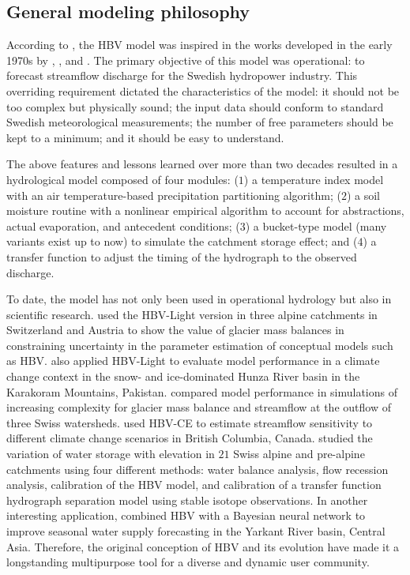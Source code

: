 \subsection{General modeling philosophy}

According to \citet{bergstrom:2015}, the HBV model was inspired in the works developed in the early 1970s by
\citet{nash:1970}, \citet{oconnell:1970}, and \citet{mandeville:1970}. The primary objective of this model was operational: to
forecast streamflow discharge for the Swedish hydropower industry. This overriding requirement dictated the characteristics of the
model: it should not be too complex but physically sound; the input data should conform to standard Swedish meteorological
measurements; the number of free parameters should be kept to a minimum; and it should be easy to understand.

The above features and lessons learned over more than two decades \citep{bergstrom:1991} resulted in a hydrological model
composed of four modules: ($1$) a temperature index model with an air temperature-based precipitation partitioning algorithm;
($2$) a soil moisture routine with a nonlinear empirical algorithm to account for abstractions, actual evaporation, and antecedent
conditions; ($3$) a bucket-type model (many variants exist up to now) to simulate the catchment storage effect; and ($4$) a transfer function to adjust the timing of the hydrograph to
the observed discharge.

To date, the model has not only been used in operational hydrology but also in scientific research.
\citet{konz:2010} used the HBV-Light version in three alpine catchments in Switzerland and Austria to show the value of glacier
mass balances in constraining uncertainty in the parameter estimation of conceptual models such as HBV. \citet{ali:2018} also applied
HBV-Light to evaluate model performance in a climate change context in the snow- and ice-dominated Hunza River basin in the
Karakoram Mountains, Pakistan. \citet{finger:2015} compared model performance in simulations of increasing complexity for glacier
mass balance and streamflow at the outflow of three Swiss watersheds. \citet{stahl_hbv:2008} used HBV-CE to estimate streamflow
sensitivity to different climate change scenarios in British Columbia, Canada. \citet{staudinger:2017} studied the variation of 
water storage with elevation in $21$ Swiss alpine and pre-alpine catchments using four different methods: water balance analysis, 
flow recession analysis, calibration of the HBV model, and calibration of a transfer function hydrograph separation model using 
stable isotope observations. In another interesting application, \citet{ren:2018} combined HBV with a Bayesian neural network to 
improve seasonal water supply forecasting in the Yarkant River basin, Central Asia. Therefore, the original conception of HBV and 
its evolution have made it a longstanding multipurpose tool for a diverse and dynamic user community.


